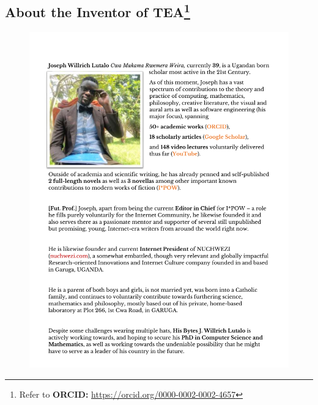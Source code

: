 \documentclass[a4paper, 18pt]{book} %
\begin{document}
\begin{center}
\vspace*{\fill}

\chapter*{About the Inventor of TEA\footnote{Refer to \textbf{ORCID:} \url{https://orcid.org/0000-0002-0002-4657}}}


\begin{figure}[H]
  \begin{center}
   \includegraphics[trim=0cm 1cm 0cm 2cm, clip, height=0.8\textheight,]{resources/pdfs/AboutAuthor.pdf}\\
  \end{center}
\end{figure}

\vspace*{\fill}
\end{center}



\end{document}
